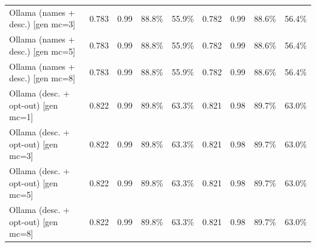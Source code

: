 \begin{tabular}{lcccccccc}
Ollama (names + desc.) [gen mc=3] & 0.783 & 0.99 & 88.8\% & 55.9\% & 0.782 & 0.99 & 88.6\% & 56.4\% \\
Ollama (names + desc.) [gen mc=5] & 0.783 & 0.99 & 88.8\% & 55.9\% & 0.782 & 0.99 & 88.6\% & 56.4\% \\
Ollama (names + desc.) [gen mc=8] & 0.783 & 0.99 & 88.8\% & 55.9\% & 0.782 & 0.99 & 88.6\% & 56.4\% \\
Ollama (desc. + opt-out) [gen mc=1] & 0.822 & 0.99 & 89.8\% & 63.3\% & 0.821 & 0.98 & 89.7\% & 63.0\% \\
Ollama (desc. + opt-out) [gen mc=3] & 0.822 & 0.99 & 89.8\% & 63.3\% & 0.821 & 0.98 & 89.7\% & 63.0\% \\
Ollama (desc. + opt-out) [gen mc=5] & 0.822 & 0.99 & 89.8\% & 63.3\% & 0.821 & 0.98 & 89.7\% & 63.0\% \\
Ollama (desc. + opt-out) [gen mc=8] & 0.822 & 0.99 & 89.8\% & 63.3\% & 0.821 & 0.98 & 89.7\% & 63.0\% \\
\bottomrule
\end{tabular}
